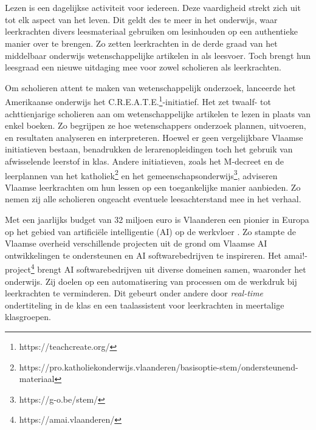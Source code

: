 
\chapter{}%
\label{ch:inleiding}

Lezen is een dagelijkse activiteit voor iedereen. Deze vaardigheid strekt zich uit tot elk aspect van het leven. Dit geldt des te meer in het onderwijs, waar leerkrachten divers leesmateriaal gebruiken om lesinhouden op een authentieke manier over te brengen. Zo zetten leerkrachten in de derde graad van het middelbaar onderwijs wetenschappelijke artikelen in als leesvoer. Toch brengt hun leesgraad een nieuwe uitdaging mee voor zowel scholieren als leerkrachten. 

\medspace

Om scholieren attent te maken van wetenschappelijk onderzoek, lanceerde het Amerikaanse onderwijs het C.R.E.A.T.E.\footnote{https://teachcreate.org/}-initiatief. Het zet twaalf- tot achttienjarige scholieren aan om wetenschappelijke artikelen te lezen in plaats van enkel boeken. Zo begrijpen ze hoe wetenschappers onderzoek plannen, uitvoeren, en resultaten analyseren en interpreteren. Hoewel er geen vergelijkbare Vlaamse initiatieven bestaan, benadrukken de lerarenopleidingen toch het gebruik van afwisselende leerstof in klas. Andere initiatieven, zoals het M-decreet en de leerplannen van het katholiek\footnote{https://pro.katholiekonderwijs.vlaanderen/basisoptie-stem/ondersteunend-materiaal} en het gemeenschapsonderwijs\footnote{https://g-o.be/stem/}, adviseren Vlaamse leerkrachten om hun lessen op een toegankelijke manier aanbieden. Zo nemen zij alle scholieren ongeacht eventuele leesachterstand mee in het verhaal.

\medspace

Met een jaarlijks budget van 32 miljoen euro is Vlaanderen een pionier in Europa op het gebied van artificiële intelligentie (AI) op de werkvloer \autocite{Crevits2022}. Zo stampte de Vlaamse overheid verschillende  projecten uit de grond om Vlaamse AI ontwikkelingen te ondersteunen en AI softwarebedrijven te inspireren. Het amai!-project\footnote{https://amai.vlaanderen/} brengt AI softwarebedrijven uit diverse domeinen samen, waaronder het onderwijs. Zij doelen op een automatisering van processen om de werkdruk bij leerkrachten te verminderen. Dit gebeurt onder andere door \textit{real-time} ondertiteling in de klas en een taalassistent voor leerkrachten in meertalige klasgroepen.


